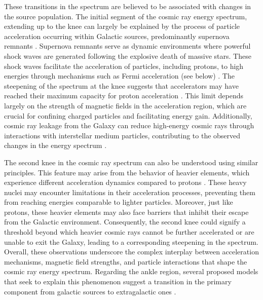 These transitions in the spectrum are believed to be associated with changes in the source population. The initial segment of the cosmic ray energy spectrum, extending up to the knee can largely be explained by the process of particle acceleration occurring within Galactic sources, predominantly supernova remnants . Supernova remnants serve as dynamic environments where powerful shock waves are generated following the explosive death of massive stars. These shock waves facilitate the acceleration of particles, including protons, to high energies through mechanisms such as Fermi acceleration (see below) . The steepening of the spectrum at the knee suggests that accelerators may have reached their maximum capacity for proton acceleration  . This limit depends largely on the strength of magnetic fields in the acceleration region, which are crucial for confining charged particles and facilitating energy gain. Additionally, cosmic ray leakage from the Galaxy can reduce high-energy cosmic rays through interactions with interstellar medium particles, contributing to the observed changes in the energy spectrum . 

The second knee in the cosmic ray spectrum can also be understood using similar principles. This feature may arise from the behavior of heavier elements, which experience different acceleration dynamics compared to protons . These heavy nuclei may encounter limitations in their acceleration processes, preventing them from reaching energies comparable to lighter particles. Moreover, just like protons, these heavier elements may also face barriers that inhibit their escape from the Galactic environment. Consequently, the second knee could signify a threshold beyond which heavier cosmic rays cannot be further accelerated or are unable to exit the Galaxy, leading to a corresponding steepening in the spectrum. Overall, these observations underscore the complex interplay between acceleration mechanisms, magnetic field strengths, and particle interactions that shape the cosmic ray energy spectrum. Regarding the ankle region, several proposed models that seek to explain this phenomenon suggest a transition in the primary component from galactic sources to extragalactic ones . 


